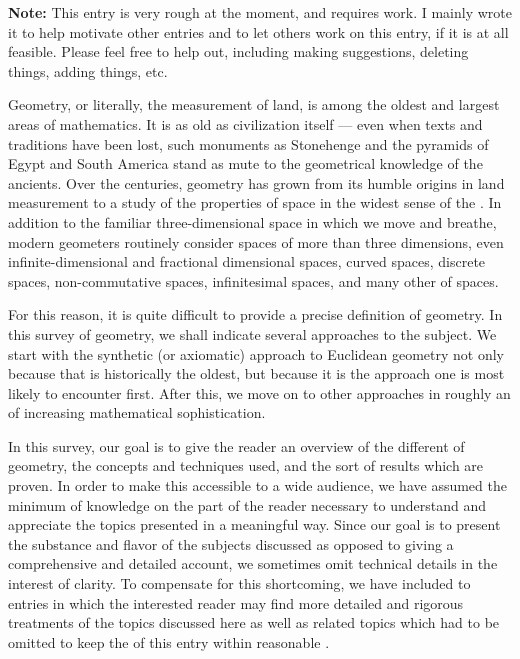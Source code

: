 \documentclass[12pt]{article}
\begin{document}

{\bf Note:} This entry is very rough at the moment, and requires
work. I mainly wrote it to help motivate other entries and to let
others work on this entry, if it is at all feasible. Please feel free
to help out, including making suggestions, deleting things, adding
things, etc.

Geometry, or literally, the measurement of land, is among the oldest
and largest areas of mathematics.  It is as old as civilization itself
--- even when texts and traditions have been lost, such monuments as
Stonehenge and the pyramids of Egypt and South America stand as mute
 to the geometrical knowledge of the
ancients.  Over the centuries, geometry has grown from its humble
origins in land measurement to a study of the properties of space in
the widest sense of the .  In addition to the
familiar three-dimensional space in which we move and breathe, modern
geometers routinely consider spaces of more than three dimensions,
even infinite-dimensional and fractional dimensional spaces, curved
spaces, discrete spaces, non-commutative spaces, infinitesimal spaces,
and many other  of spaces.

For this reason, it is quite difficult to provide a precise definition
of geometry. In this survey of geometry, we shall indicate several
approaches to the subject.  We start with the synthetic (or axiomatic)
approach to Euclidean geometry not only because that is historically
the oldest, but because it is the approach one is most likely to
encounter first.  After this, we move on to other approaches in
roughly an  of increasing mathematical
sophistication.

In this survey, our goal is to give the reader an overview of the
different  of geometry, the concepts and
techniques used, and the sort of results which are proven.  In order
to make this accessible to a wide audience, we have assumed the
minimum of knowledge on the part of the reader necessary to understand
and appreciate the topics presented in a meaningful way.  Since our
goal is to present the substance and flavor of the subjects discussed
as opposed to giving a comprehensive and detailed account, we
sometimes omit technical details in the interest of clarity.  To
compensate for this shortcoming, we have included
 to entries in which the interested reader may
find more detailed and rigorous treatments of the topics discussed
here as well as related topics which had to be omitted to keep the
 of this entry within reasonable
.
\end{document}
